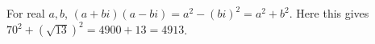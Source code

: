 For real $a,b$, $(a+bi)(a-bi)=a^2-(bi)^2=a^2+b^2$. Here this gives $70^2+\left(\sqrt{13}\right)^2=4900+13=\boxed{4913}$.
